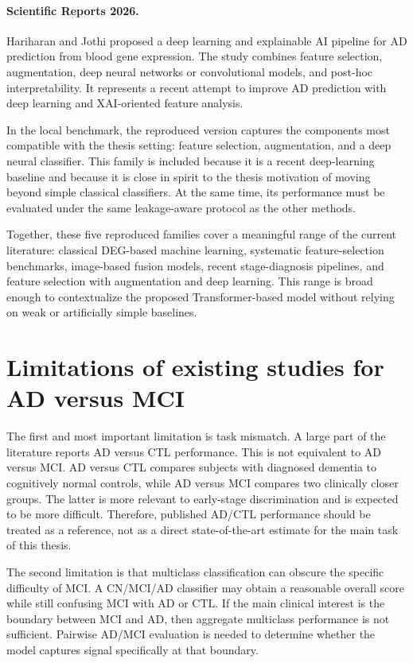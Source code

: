 \paragraph{Scientific Reports 2026.}
Hariharan and Jothi \cite{hariharan2026xai} proposed a deep learning and explainable AI pipeline for AD prediction from blood gene expression. The study combines feature selection, augmentation, deep neural networks or convolutional models, and post-hoc interpretability. It represents a recent attempt to improve AD prediction with deep learning and XAI-oriented feature analysis.

In the local benchmark, the reproduced version captures the components most compatible with the thesis setting: feature selection, augmentation, and a deep neural classifier. This family is included because it is a recent deep-learning baseline and because it is close in spirit to the thesis motivation of moving beyond simple classical classifiers. At the same time, its performance must be evaluated under the same leakage-aware protocol as the other methods.

Together, these five reproduced families cover a meaningful range of the current literature: classical DEG-based machine learning, systematic feature-selection benchmarks, image-based fusion models, recent stage-diagnosis pipelines, and feature selection with augmentation and deep learning. This range is broad enough to contextualize the proposed Transformer-based model without relying on weak or artificially simple baselines.

\section{Limitations of existing studies for AD versus MCI}
\label{sec:sota-limitations}

The first and most important limitation is task mismatch. A large part of the literature reports AD versus CTL performance. This is not equivalent to AD versus MCI. AD versus CTL compares subjects with diagnosed dementia to cognitively normal controls, while AD versus MCI compares two clinically closer groups. The latter is more relevant to early-stage discrimination and is expected to be more difficult. Therefore, published AD/CTL performance should be treated as a reference, not as a direct state-of-the-art estimate for the main task of this thesis.

The second limitation is that multiclass classification can obscure the specific difficulty of MCI. A CN/MCI/AD classifier may obtain a reasonable overall score while still confusing MCI with AD or CTL. If the main clinical interest is the boundary between MCI and AD, then aggregate multiclass performance is not sufficient. Pairwise AD/MCI evaluation is needed to determine whether the model captures signal specifically at that boundary.

